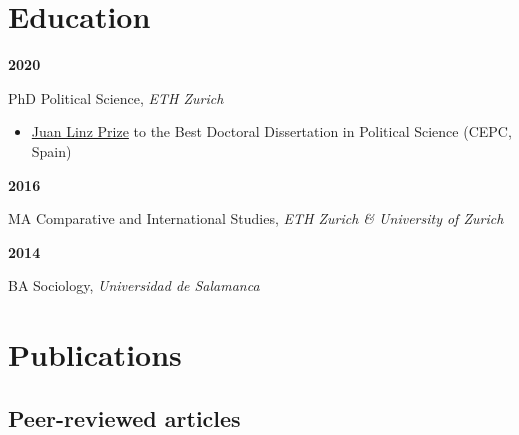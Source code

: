 \documentclass[a4paper, 12pt]{article}
\renewcommand\labelitemi{\textbf{--}}
\begin{document}
\vspace{-0pt}
\section*{Education}

\begin{minipage}[t]{0.1\textwidth}
  \flushleft
	\textbf{2020}
\end{minipage}
\begin{minipage}[t]{0.9\textwidth}
  PhD Political Science, \textit{ETH Zurich}
	\vspace{-5pt}
	\begin{itemize}[leftmargin=18pt]\small
		\renewcommand\labelitemi{{\boldmath$\cdot$}}
	  \item \href{https://www.cepc.gob.es/premio-juan-linz}{Juan Linz Prize} to the Best Doctoral Dissertation in Political Science (CEPC, Spain)
	\end{itemize}
\end{minipage}

\vspace{10pt}

\noindent
\begin{minipage}[t]{0.1\textwidth}
  \flushleft
	\textbf{2016}
\end{minipage}
\begin{minipage}[t]{0.9\textwidth}
  MA Comparative and International Studies, \textit{ETH Zurich \& University of Zurich}
\end{minipage}


\noindent
\begin{minipage}[t]{0.1\textwidth}
  \flushleft
	\textbf{2014}
\end{minipage}
\begin{minipage}[t]{0.9\textwidth}
  BA Sociology, \textit{Universidad de Salamanca}
\end{minipage}

\section*{Publications}

\subsection*{Peer-reviewed articles}
\end{document}

